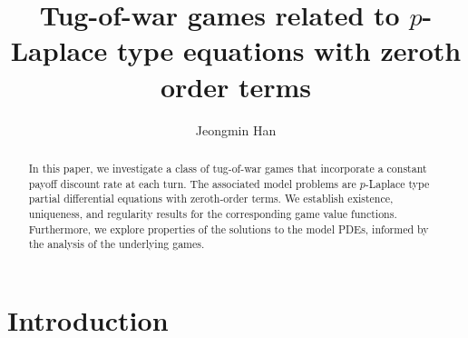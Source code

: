 \documentclass[english]{amsart}
\theoremstyle{plain}
\theoremstyle{definition}
\theoremstyle{remark}
\numberwithin{equation}{section}
\begin{document}
\title[]{Tug-of-war games related to $p$-Laplace type equations with zeroth order terms}

\author{Jeongmin Han}
\address{Department of Mathematics and Creative Research Institute, Soongsil University, 
06978 Seoul, Republic of Korea}





\begin{abstract}
In this paper, we investigate a class of tug-of-war games that incorporate a constant payoff discount rate at each turn. 
The associated model problems are $p$-Laplace type partial differential equations with zeroth-order terms. 
We establish existence, uniqueness, and regularity results for the corresponding game value functions. 
Furthermore, we explore properties of the solutions to the model PDEs, informed by the analysis of the underlying games.
\end{abstract}

\maketitle
\tableofcontents


\section{Introduction}
\end{document}

